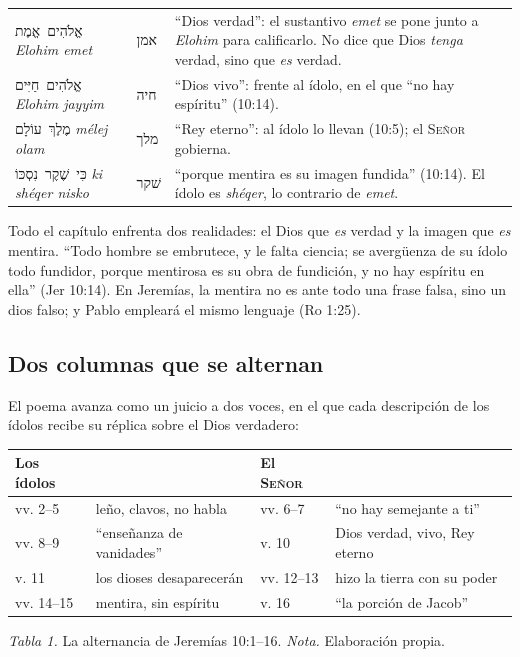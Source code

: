 \documentclass[11pt,letterpaper]{article}
\newcommand{\heb}[1]{\mbox{\foreignlanguage{hebrew}{#1}}}
\newcommand{\SENOR}{\textsc{Señor}}
\begin{document}
\begin{filologia}[Jer 10:10]
\begin{tabular}{@{}L{3.2cm}L{1.6cm}L{10cm}@{}}
\heb{אֱלֹהִים אֱמֶת} \emph{Elohim emet} & \heb{אמן} & ``Dios verdad'': el sustantivo \emph{emet} se pone junto a \emph{Elohim} para calificarlo. No dice que Dios \emph{tenga} verdad, sino que \emph{es} verdad. \\[2pt]
\heb{אֱלֹהִים חַיִּים} \emph{Elohim jayyim} & \heb{חיה} & ``Dios vivo'': frente al ídolo, en el que ``no hay espíritu'' (10:14). \\[2pt]
\heb{מֶלֶךְ עוֹלָם} \emph{mélej olam} & \heb{מלך} & ``Rey eterno'': al ídolo lo llevan (10:5); el \SENOR{} gobierna. \\[2pt]
\heb{כִּי שֶׁקֶר נִסְכּוֹ} \emph{ki shéqer nisko} & \heb{שׁקר} & ``porque mentira es su imagen fundida'' (10:14). El ídolo es \emph{shéqer}, lo contrario de \emph{emet}. \\
\end{tabular}
\end{filologia}

Todo el capítulo enfrenta dos realidades: el Dios que \emph{es} verdad y la imagen que \emph{es} mentira. ``Todo hombre se embrutece, y le falta ciencia; se avergüenza de su ídolo todo fundidor, porque mentirosa es su obra de fundición, y no hay espíritu en ella'' (Jer 10:14). En Jeremías, la mentira no es ante todo una frase falsa, sino un dios falso; y Pablo empleará el mismo lenguaje (Ro 1:25).

\subsection{Dos columnas que se alternan}
El poema avanza como un juicio a dos voces, en el que cada descripción de los ídolos recibe su réplica sobre el Dios verdadero:

\begin{center}\small\renewcommand{\arraystretch}{1.2}
\begin{tabular}{@{}L{3.0cm}L{4.4cm}L{3.0cm}L{4.0cm}@{}}
\toprule
\textbf{Los ídolos} & & \textbf{El \SENOR} & \\ \midrule
vv. 2--5 & leño, clavos, no habla & vv. 6--7 & ``no hay semejante a ti'' \\
vv. 8--9 & ``enseñanza de vanidades'' & v. 10 & Dios verdad, vivo, Rey eterno \\
v. 11 & los dioses desaparecerán & vv. 12--13 & hizo la tierra con su poder \\
vv. 14--15 & mentira, sin espíritu & v. 16 & ``la porción de Jacob'' \\
\bottomrule
\end{tabular}\par
{\footnotesize\color{gris}\textit{Tabla 1.} La alternancia de Jeremías 10:1--16. \textit{Nota.} Elaboración propia.}
\end{center}
\end{document}
